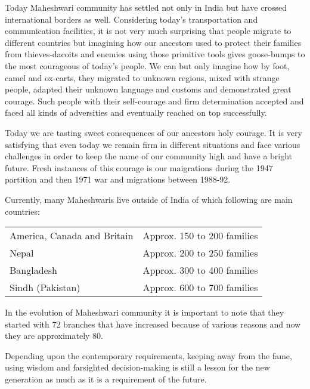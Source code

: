 Today Maheshwari community has settled not only in India but have crossed international borders as well. Considering today's transportation and communication facilities, it is not very much surprising that people migrate to different countries but imagining how our ancestors used to protect their families from thieves-dacoits and enemies using those primitive tools gives goose-bumps to the most courageous of today's people. We can but only imagine how by foot, camel and ox-carts, they migrated to unknown regions, mixed with strange people, adapted their unknown language and customs and demonstrated great courage. Such people with their self-courage and firm determination accepted and faced all kinds of adversities and eventually reached on top successfully.

Today we are tasting sweet consequences of our ancestors holy courage. It is very satisfying that even today we remain firm in different situations and face various challenges in order to keep the name of our community high and have a bright future. Fresh instances of this courage is our maigrations during the 1947 partition and then 1971 war and migrations between 1988-92.

Currently, many Maheshwaris live outside of India of which following are main countries:
\begin{center}
\begin{tabular}{ll}
America, Canada and Britain & Approx. 150 to 200 families \\ 
Nepal & Approx. 200 to 250 families \\ 
Bangladesh & Approx. 300 to 400 families \\ 
Sindh (Pakistan) & Approx. 600 to 700 families
\end{tabular}
\end{center}

In the evolution of Maheshwari community it is important to note that they started with 72 branches that have increased because of various reasons and now they are approximately 80.

Depending upon the contemporary requirements, keeping away from the fame, using wisdom and farsighted decision-making is still a lesson for the new generation as much as it is a requirement of the future.
